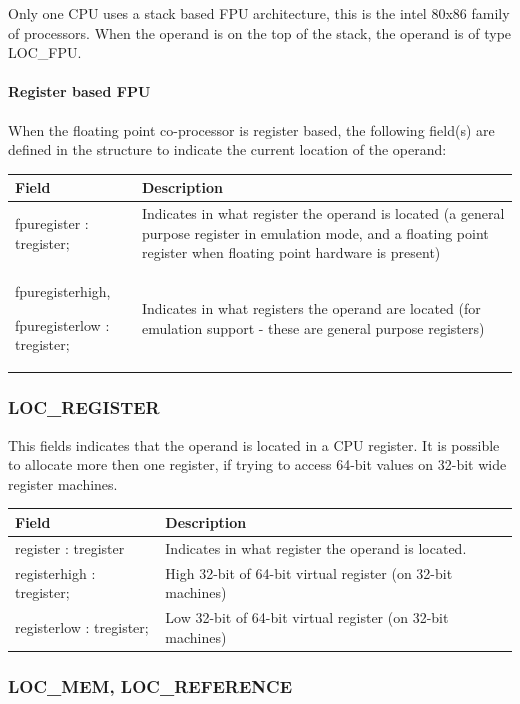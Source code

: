 \documentclass [12pt]{article}
\begin{document}
Only one CPU uses a stack based FPU architecture, this is the intel 80x86 
family of processors. When the operand is on the top of the stack, the 
operand is of type LOC{\_}FPU.

\paragraph{Register based FPU}

When the floating point co-processor is register based, the following 
field(s) are defined in the structure to indicate the current location of 
the operand:

\begin{longtable}{|l|p{7cm}|}
\hline
Field   & Description \\
\hline
\endhead
\hline
\endfoot
\textsf{fpuregister : tregister;}& 
    Indicates in what register the operand is located (a general purpose
    register in emulation mode, and a floating point register when floating
    point hardware is present) \\
\textsf{fpuregisterhigh, } \par \textsf{fpuregisterlow : tregister;}& 
    Indicates in what registers the operand are located (for emulation
    support - these are general purpose registers)
\end{longtable}

\subsubsection{LOC{\_}REGISTER}
\label{subsubsec:mylabel20}

This fields indicates that the operand is located in a CPU register. It is 
possible to allocate more then one register, if trying to access 64-bit 
values on 32-bit wide register machines.

\begin{longtable}{|l|p{10cm}|}
\hline
Field   & Description \\
\hline
\endhead
\hline
\endfoot
\textsf{register : tregister}& 
    Indicates in what register the operand is located. \\
\textsf{registerhigh : tregister;}& 
    High 32-bit of 64-bit virtual register (on 32-bit machines) \\
\textsf{registerlow : tregister;}& 
    Low 32-bit of 64-bit virtual register (on 32-bit machines)
\end{longtable}

\subsubsection{LOC{\_}MEM, LOC{\_}REFERENCE}
\label{subsubsec:mylabel21}
\end{document}
